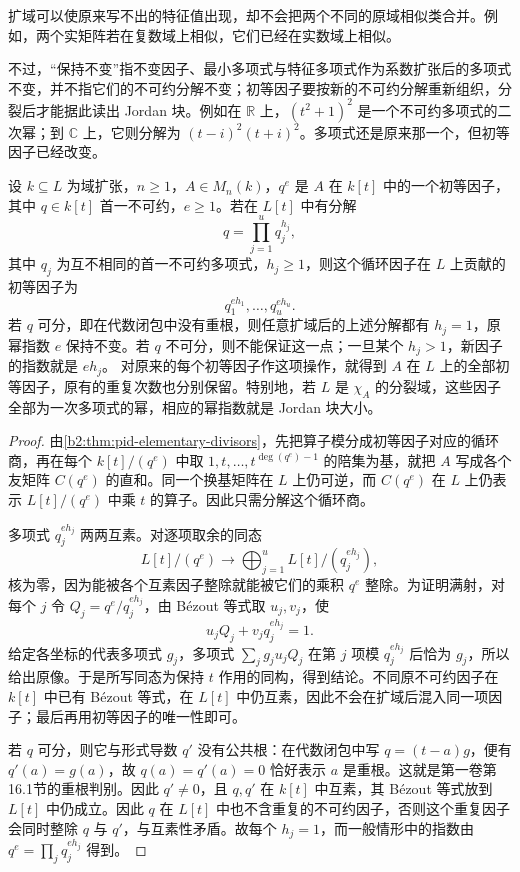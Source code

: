 扩域可以使原来写不出的特征值出现，却不会把两个不同的原域相似类合并。例如，两个实矩阵若在复数域上相似，它们已经在实数域上相似。

\ProseParagraphBreak
不过，“保持不变”指不变因子、最小多项式与特征多项式作为系数扩张后的多项式不变，并不指它们的不可约分解不变；初等因子要按新的不可约分解重新组织，分裂后才能据此读出 Jordan 块。例如在 \(\mathbb R\) 上，\((t^2+1)^2\) 是一个不可约多项式的二次幂；到 \(\mathbb C\) 上，它则分解为 \((t-i)^2(t+i)^2\)。多项式还是原来那一个，但初等因子已经改变。

\begin{proposition}\label{b2:prop:scalar-extension-elementary-divisors}
	设 \(k\subseteq L\) 为域扩张，\(n\ge1\)，\(A\in M_n(k)\)，\(q^e\) 是 \(A\) 在 \(k[t]\) 中的一个初等因子，其中 \(q\in k[t]\) 首一不可约，\(e\ge1\)。若在 \(L[t]\) 中有分解
	\[
		q=\prod_{j=1}^u q_j^{h_j},
	\]
	其中 \(q_j\) 为互不相同的首一不可约多项式，\(h_j\ge1\)，则这个循环因子在 \(L\) 上贡献的初等因子为
	\[
		q_1^{eh_1},\ldots,q_u^{eh_u}.
	\]
	若 \(q\) 可分，即在代数闭包中没有重根，则任意扩域后的上述分解都有 \(h_j=1\)，原幂指数 \(e\) 保持不变。若 \(q\) 不可分，则不能保证这一点；一旦某个 \(h_j>1\)，新因子的指数就是 \(eh_j\)。 对原来的每个初等因子作这项操作，就得到 \(A\) 在 \(L\) 上的全部初等因子，原有的重复次数也分别保留。特别地，若 \(L\) 是 \(\chi_A\) 的分裂域，这些因子全部为一次多项式的幂，相应的幂指数就是 Jordan 块大小。
\end{proposition}
\begin{proof}
	由\cref{b2:thm:pid-elementary-divisors}，先把算子模分成初等因子对应的循环商，再在每个 \(k[t]/(q^e)\) 中取 \(1,t,\ldots,t^{\deg(q^e)-1}\) 的陪集为基，就把 \(A\) 写成各个友矩阵 \(C(q^e)\) 的直和。同一个换基矩阵在 \(L\) 上仍可逆，而 \(C(q^e)\) 在 \(L\) 上仍表示 \(L[t]/(q^e)\) 中乘 \(t\) 的算子。因此只需分解这个循环商。

	多项式 \(q_j^{eh_j}\) 两两互素。对逐项取余的同态
	\[
		L[t]/(q^e)\longrightarrow \bigoplus_{j=1}^u L[t]/(q_j^{eh_j}),
	\]
	核为零，因为能被各个互素因子整除就能被它们的乘积 \(q^e\) 整除。为证明满射，对每个 \(j\) 令 \(Q_j=q^e/q_j^{eh_j}\)，由 Bézout 等式取 \(u_j,v_j\)，使
	\[
		u_jQ_j+v_jq_j^{eh_j}=1.
	\]
	给定各坐标的代表多项式 \(g_j\)，多项式 \(\sum_j g_ju_jQ_j\) 在第 \(j\) 项模 \(q_j^{eh_j}\) 后恰为 \(g_j\)，所以给出原像。于是所写同态为保持 \(t\) 作用的同构，得到结论。不同原不可约因子在 \(k[t]\) 中已有 Bézout 等式，在 \(L[t]\) 中仍互素，因此不会在扩域后混入同一项因子；最后再用初等因子的唯一性即可。

	若 \(q\) 可分，则它与形式导数 \(q'\) 没有公共根：在代数闭包中写 \(q=(t-a)g\)，便有 \(q'(a)=g(a)\)，故 \(q(a)=q'(a)=0\) 恰好表示 \(a\) 是重根。这就是第一卷第16.1节的重根判别。因此 \(q'\ne0\)，且 \(q,q'\) 在 \(k[t]\) 中互素，其 Bézout 等式放到 \(L[t]\) 中仍成立。因此 \(q\) 在 \(L[t]\) 中也不含重复的不可约因子，否则这个重复因子会同时整除 \(q\) 与 \(q'\)，与互素性矛盾。故每个 \(h_j=1\)，而一般情形中的指数由 \(q^e=\prod_jq_j^{eh_j}\) 得到。
\end{proof}

